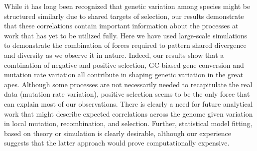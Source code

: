 While it has long been recognized that genetic variation among species might be
structured similarly due to shared targets of selection,
our results demonstrate that these correlations contain important information about the processes at work that has yet to be utilized fully.
Here we have used large-scale simulations to demonstrate the combination of forces required 
to pattern shared divergence and diversity as we observe it in nature.
Indeed, our results show that a combination of negative and positive selection,
GC-biased gene conversion and mutation rate variation all contribute in shaping genetic variation in the great apes.
Although some processes are not necessarily needed to recapitulate the real data (\eg mutation rate variation),
positive selection seems to be the only force that can explain most of our observations.
There is clearly a need for future analytical work that might describe expected correlations across the genome
given variation in local mutation, recombination, and selection.
Further, statistical model fitting, based on theory or simulation is clearly desirable,
although our experience suggests that the latter approach would prove computationally expensive. 
